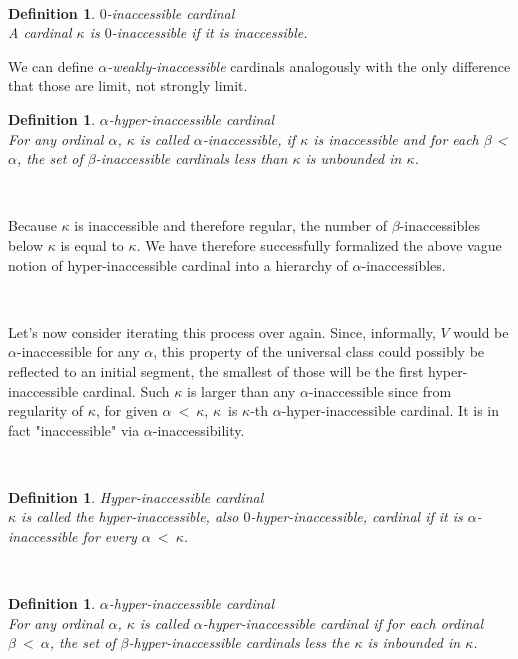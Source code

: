 \documentclass[12pt,a4paper]{article}
\newtheorem{definition}[theorem]{Definition}
\begin{document}
\

\begin{definition}{$0$-inaccessible cardinal}\\
A cardinal $\kappa$ is $0$-inaccessible if it is inaccessible.
\end{definition}
We can define \emph{$\alpha$-weakly-inaccessible} cardinals analogously with the only difference that those are limit, not strongly limit.
\

\begin{definition}{$\alpha$-hyper-inaccessible cardinal}\label{def:alpha_inaccessible}\\
For any ordinal $\alpha$, $\kappa$ is called $\alpha$-inaccessible, if $\kappa$ is inaccessible and for each $\beta$ < $\alpha$, the set of $\beta$-inaccessible cardinals less than $\kappa$ is unbounded in $\kappa$.
\end{definition}

\

Because $\kappa$ is inaccessible and therefore regular, the number of $\beta$-inaccessibles below $\kappa$ is equal to $\kappa$. We have therefore successfully formalized the above vague notion of hyper-inaccessible cardinal into a hierarchy of $\alpha$-inaccessibles.

\

Let's now consider iterating this process over again. Since, informally, $V$ would be $\alpha$-inaccessible for any $\alpha$, this property of the universal class could possibly be reflected to an initial segment, the smallest of those will be the first hyper-inaccessible cardinal. Such $\kappa$ is larger than any $\alpha$-inaccessible since from regularity of $\kappa$, for given $\alpha\ <\ \kappa$, $\kappa$ is $\kappa$-th $\alpha$-hyper-inaccessible cardinal. It is in fact "inaccessible" via $\alpha$-inaccessibility.

\

\begin{definition}{Hyper-inaccessible cardinal}\\
$\kappa$ is called the hyper-inaccessible, also $0$-hyper-inaccessible, cardinal if it is $\alpha$-inaccessible for every $\alpha\ <\ \kappa$.
\end{definition}

\

\begin{definition}{$\alpha$-hyper-inaccessible cardinal}\\
For any ordinal $\alpha$, $\kappa$ is called $\alpha$-hyper-inaccessible cardinal if for each ordinal $\beta\ <\ \alpha$, the set of $\beta$-hyper-inaccessible cardinals less the $\kappa$ is inbounded in $\kappa$.
\end{definition}
\end{document}
